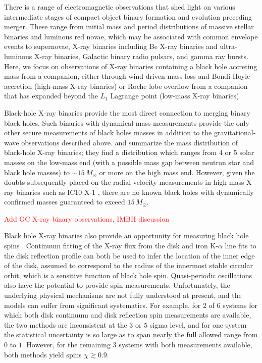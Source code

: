 \documentclass[iop,onecolumn]{revtex4}
\newcommand{\todo}[1]{\textcolor{red}{#1}}
\begin{document}
There is a range of electromagnetic observations that shed light on various intermediate stages of compact object binary formation and evolution preceding merger.  These range from initial mass and period distributions of massive stellar binaries \citep[e.g.,][]{Sana:2012} and luminous red novae, which may be associated with common envelope events \citep{Ivanova:2013LRN} to supernovae, X-ray binaries including Be X-ray binaries and ultra-luminous X-ray binaries, Galactic binary radio pulsars, and gamma ray bursts.  Here, we focus on observations of X-ray binaries containing a black hole accreting mass from a companion, either through wind-driven mass loss and Bondi-Hoyle accretion (high-mass X-ray binaries) or Roche lobe overflow from a companion that has expanded beyond the $L_1$ Lagrange point  (low-mass X-ray binaries).   

Black-hole X-ray binaries provide the most direct connection to merging binary black holes.  Such binaries with dynamical mass measurements provide the only other secure measurements of black holes masses in addition to the gravitational-wave observations described above.  \citet{Ozel:2010} and \citet{Farr:2011} summarize the mass distribution of black-hole X-ray binaries; they find a distribution which ranges from 4 or 5 solar masses on the low-mass end (with a possible mass gap between neutron star and black hole masses) to $\sim 15\, M_\odot$ or more on the high mass end.  However, given the doubts subsequently placed on the radial velocity measurements in high-mass X-ray binaries such as IC10 X-1 \citep{Laycock:2015}, there are no known black holes with dynamically confirmed masses guaranteed to exceed $15\, M_\odot$.

\todo{Add GC X-ray binary observations, IMBH discussion} 

Black hole X-ray binaries also provide an opportunity for measuring black hole spins \citep[see][for a recent review]{MillerMiller:2016}.  Continuum fitting of the X-ray flux from the disk and iron K-$\alpha$ line fits to the disk reflection profile can both be used to infer the location of the inner edge of the disk, assumed to correspond to the radius of the innermost stable circular orbit, which is a sensitive function of black hole spin.  Quasi-periodic oscillations also have the potential to provide spin measurements.  Unfortunately, the underlying physical mechanisms are not fully understood at present, and the models can suffer from significant systematics.  For example, for 2 of 6 systems for which both disk continuum and disk reflection spin measurements are available, the two methods are inconsistent at the $3$ or $5$ sigma level, and for one system the statistical uncertainty is so large as to span nearly the full allowed range from $0$ to $1$.  However, for the remaining 3 systems with both measurements available, both methods yield spins $\chi \gtrsim 0.9$.  
\end{document}
